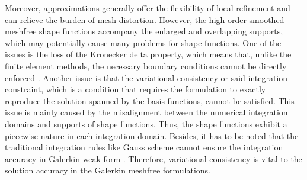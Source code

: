 Moreover, \DIFdelbegin {}\DIFdelend \DIFaddbegin {}\DIFaddend approximations generally offer the flexibility of local refinement and can relieve the burden of mesh distortion. 
\DIFdelbegin {}\DIFdelend However, the high order smoothed meshfree shape functions accompany the enlarged and overlapping supports, which may potentially cause many problems for shape functions. One of the issues is the loss of the Kronecker delta property, which means that, unlike the finite element methods, the necessary boundary conditions cannot be directly enforced  \cite{fernandez-mendez2004}. Another issue is that the variational consistency or said integration constraint, which is a condition that requires the formulation to exactly reproduce the solution spanned by the basis functions, cannot be satisfied. This issue is mainly caused by the misalignment between the numerical integration domains and supports of shape functions. Thus, the shape functions exhibit a piecewise nature in each integration domain. Besides, it has to be noted that the traditional integration rules like Gauss scheme cannot ensure the integration accuracy in Galerkin weak form \cite{li2016, wu2021}. Therefore, variational consistency is vital to the solution accuracy in the Galerkin meshfree formulations.

